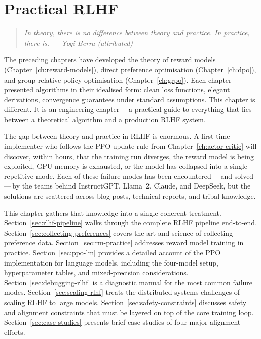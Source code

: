 \chapter{Practical RLHF}
\label{ch:practical-rlhf}

\begin{quote}
\itshape
In theory, there is no difference between theory and practice. In practice, there is. \upshape --- Yogi Berra (attributed)
\end{quote}

\bigskip

The preceding chapters have developed the theory of reward models (Chapter~\ref{ch:reward-models}), direct preference optimisation (Chapter~\ref{ch:dpo}), and group relative policy optimisation (Chapter~\ref{ch:grpo}). Each chapter presented algorithms in their idealised form: clean loss functions, elegant derivations, convergence guarantees under standard assumptions. This chapter is different. It is an engineering chapter\,---\,a practical guide to everything that lies between a theoretical algorithm and a production RLHF system.

The gap between theory and practice in RLHF is enormous. A first-time implementer who follows the PPO update rule from Chapter~\ref{ch:actor-critic} will discover, within hours, that the training run diverges, the reward model is being exploited, GPU memory is exhausted, or the model has collapsed into a single repetitive mode. Each of these failure modes has been encountered\,---\,and solved\,---\,by the teams behind InstructGPT, Llama~2, Claude, and DeepSeek, but the solutions are scattered across blog posts, technical reports, and tribal knowledge.

This chapter gathers that knowledge into a single coherent treatment. Section~\ref{sec:rlhf-pipeline} walks through the complete RLHF pipeline end-to-end. Section~\ref{sec:collecting-preferences} covers the art and science of collecting preference data. Section~\ref{sec:rm-practice} addresses reward model training in practice. Section~\ref{sec:ppo-lm} provides a detailed account of the PPO implementation for language models, including the four-model setup, hyperparameter tables, and mixed-precision considerations. Section~\ref{sec:debugging-rlhf} is a diagnostic manual for the most common failure modes. Section~\ref{sec:scaling-rlhf} treats the distributed systems challenges of scaling RLHF to large models. Section~\ref{sec:safety-constraints} discusses safety and alignment constraints that must be layered on top of the core training loop. Section~\ref{sec:case-studies} presents brief case studies of four major alignment efforts.

